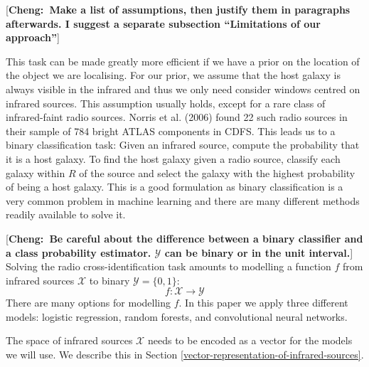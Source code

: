 \documentclass[fleqn,usenatbib,usedcolumn]{mnras}
\newcommand{\cheng}[1]{ {\color{teal}[{\bf Cheng:~{#1}}]} }
\begin{document}
    \cheng{Make a list of assumptions, then justify them in paragraphs afterwards.
      I suggest a separate subsection ``Limitations of our approach''}

    This task can be made greatly more efficient if we have a prior on the
    location of the object we are localising. For our prior, we assume that
    the host galaxy is always visible in the infrared and thus we only need
    consider windows centred on infrared sources. This assumption usually
    holds, except for a rare class of infrared-faint radio sources. Norris et
    al. (2006) found 22 such radio sources in their sample of 784 bright ATLAS
    components in CDFS. This leads us to a binary classification task: Given
    an infrared source, compute the probability that it is a host galaxy. To
    find the host galaxy given a radio source, classify each galaxy within
    \(R\) of the source and select the galaxy with the highest probability of
    being a host galaxy. This is a good formulation as binary classification
    is a very common problem in machine learning and there are many different
    methods readily available to solve it.

    \cheng{Be careful about the difference between a binary classifier and
      a class probability estimator. $\mathcal{Y}$ can be binary or in the unit interval.}
    Solving the radio cross-identification task amounts to modelling a
    function \(f\) from infrared sources \(\mathcal{X}\) to binary
    \(\mathcal{Y} = \{0, 1\}\): \[
        f : \mathcal{X} \to \mathcal{Y}
    \] There are many options for modelling \(f\). In this paper we apply
    three different models: logistic regression, random forests, and
    convolutional neural networks.

    The space of infrared sources \(\mathcal{X}\) needs to be encoded as a
    vector for the models we will use. We describe this in Section
    \ref{vector-representation-of-infrared-sources}.
\end{document}
